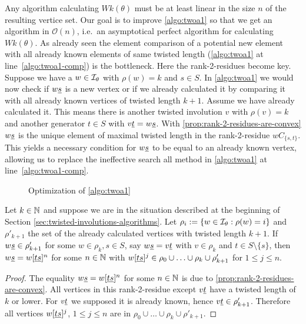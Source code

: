 Any algorithm calculating $Wk(\theta)$ must be at least linear in the size $n$ of the resulting vertice set. Our goal is to improve \ref{algo:twoa1} so that we get an algorithm in $\mathcal{O}(n)$, i.e.\ an asymptotical perfect algorithm for calculating $Wk(\theta)$. As already seen the element comparison of a potential new element with all already known elements of same twisted length (\ref{algo:twoa1} at line~\ref{algo:twoa1-comp}) is the bottleneck. Here the rank-2-residues become key. Suppose we have a $w \in \mathcal{I}_{\theta}$ with $\rho(w) = k$ and $s \in S$. In \ref{algo:twoa1} we would now check if $w \underline{s}$ is a new vertex or if we already calculated it by comparing it with all already known vertices of twisted length $k + 1$. Assume we have already calculated it. This means there is another twisted involution $v$ with $\rho(v) = k$ and another generator $t \in S$ with $v \underline{t} = w \underline{s}$. With \ref{prop:rank-2-residues-are-convex} $w \underline{s}$ is the unique element of maximal twisted length in the rank-2-residue $wC_{\{s,t\}}$. This yields a necessary condition for $w \underline{s}$ to be equal to an already known vertex, allowing us to replace the ineffective search all method in \ref{algo:twoa1} at line~\ref{algo:twoa1-comp}.

\begin{figure}[ht]
	\centering
	
	\caption{Optimization of \ref{algo:twoa1}}
	\label{fig:optimization-of-twoa1}
\end{figure}

\begin{prop}
	Let $k \in \mathbb{N}$ and suppose we are in the situation described at the beginning of Section \ref{sec:twisted-involutions-algorithms}. Let $\rho_i := \{ w \in \mathcal{I}_{\theta} : \rho(w) = i \}$ and $\rho'_{k+1}$ the set of the already calculated vertices with twisted length $k+1$. If $w \underline{s} \in \rho'_{k+1}$ for some $w \in \rho_k, s \in S$, say $w \underline{s} = v \underline{t}$ with $v \in \rho_k$ and $t \in S \setminus \{s\}$, then $w \underline{s} = w[\underline{t} \underline{s}]^n$ for some $n \in \mathbb{N}$ with $w[\underline{t} \underline{s}]^j \in \rho_0 \cup \ldots \cup \rho_k \cup \rho'_{k+1}$ for $1 \leq j \leq n$.

	\begin{proof}
		The equality $w \underline{s} = w[\underline{t} \underline{s}]^n$ for some $n \in \mathbb{N}$ is due to \ref{prop:rank-2-residues-are-convex}. All vertices in this rank-2-residue except $v \underline{t}$ have a twisted length of $k$ or lower. For $v \underline{t}$ we supposed it is already known, hence $v \underline{t} \in \rho'_{k+1}$. Therefore all vertices $w[\underline{t} \underline{s}]^j$, $1 \leq j \leq n$ are in $\rho_0 \cup \ldots \cup \rho_k \cup \rho'_{k+1}$.
	\end{proof}
\end{prop}

